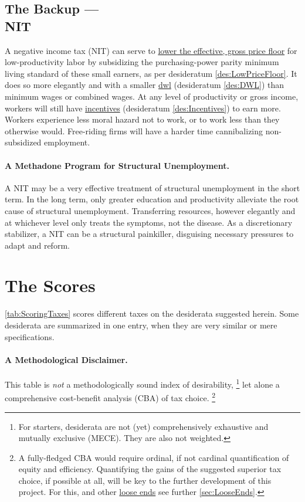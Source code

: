 \subsection[Negative Income Tax]{The Backup ---\\NIT}
	\label{sec:ScoreNIT}
A negative income tax (NIT) can serve to \hyperref[des:LowPriceFloor]{lower the effective, gross price floor} for low-productivity labor by subsidizing the purchasing-power parity minimum living standard of these small earners, as per desideratum \ref{des:LowPriceFloor}.
It does so more elegantly and with a smaller \hyperref[des:DWL]{dwl} (desideratum \ref{des:DWL}) than minimum wages or combined wages.
At any level of productivity or gross income, workers will still have \hyperref[des:Incentives]{incentives} (desideratum \ref{des:Incentives}) to earn more.
Workers experience less moral hazard not to work, or to work less than they otherwise would.
Free-riding firms will have a harder time cannibalizing non-subsidized employment.

\paragraph{A Methadone Program for Structural Unemployment.}
A NIT may be a very effective treatment of structural unemployment in the short term.
In the long term, only greater education and productivity alleviate the root cause of structural unemployment.
Transferring resources, however elegantly and at whichever level only treats the symptoms, not the disease.
As a discretionary stabilizer, a NIT can be a structural painkiller, disguising necessary pressures to adapt and reform.
\clearpage

\section{The Scores}
	\label{sec:Scores}

\autoref{tab:ScoringTaxes} scores different taxes on the desiderata suggested herein.
Some desiderata are summarized in one entry, when they are very similar or mere specifications.

\paragraph{A Methodological Disclaimer.}
This table is \emph{not} a methodologically sound index of desirability,
\footnote{
	For starters, desiderata are not (yet) comprehensively exhaustive and mutually exclusive (MECE).
	They are also not weighted.
}
let alone a comprehensive cost-benefit analysis (CBA) of tax choice.
\footnote{
	A fully-fledged CBA would require ordinal, if not cardinal quantification of equity and efficiency.
	Quantifying the gains of the suggested superior tax choice, if possible at all, will be key to the further development of this project.
	For this, and other \hyperref[sec:LooseEnds]{loose ends} see further \autoref{sec:LooseEnds}.
}

